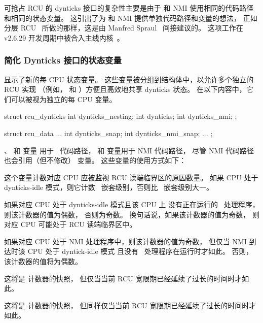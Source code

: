 可抢占 RCU 的 dynticks 接口的复杂性主要是由于
\IRQ 和 NMI 使用相同的代码路径和相同的状态变量。
这引出了为 \IRQ 和 NMI 提供单独代码路径和变量的想法，
正如分层 RCU~\cite{PaulEMcKenney2008HierarchicalRCU}
所做的那样，这是由
Manfred Spraul~\cite{ManfredSpraul2008StateMachineRCU}
间接建议的。
这项工作在 v2.6.29 开发周期中被合入主线内核~\cite{PaulEMcKenney2008commit:64db4cfff99c}。

\subsubsection{简化 Dynticks 接口的状态变量}
\label{sec:formal:State Variables for Simplified Dynticks Interface}

显示了新的每 CPU 状态变量。
这些变量被分组到结构体中，以允许多个独立的 RCU 实现
（例如， 和 ）方便且高效地共享 dynticks 状态。
在以下内容中，它们可以被视为独立的每 CPU 变量。

\begin{listing}
\begin{VerbatimL}
struct rcu_dynticks {
	int dynticks_nesting;
	int dynticks;
	int dynticks_nmi;
};

struct rcu_data {
	...
	int dynticks_snap;
	int dynticks_nmi_snap;
	...
};
\end{VerbatimL}
\caption{简单 Dynticks 接口的变量}
\label{lst:formal:Variables for Simple Dynticks Interface}
\end{listing}

、 和  变量
用于 \IRQ\ 代码路径， 和
 变量用于 NMI 代码路径，
尽管 NMI 代码路径也会引用（但不修改）
 变量。
这些变量的使用方式如下：

\begin{description}[style=nextline]
\item	[\tco{dynticks_nesting}]
	这个变量计数对应 CPU 应被监视 RCU 读端临界区的原因数量。
	如果 CPU 处于 dynticks-idle 模式，则它计数
	\IRQ\ 嵌套级别，否则比 \IRQ\ 嵌套级别大一。
\item	[\tco{dynticks}]
	如果对应 CPU 处于 dynticks-idle 模式且该 CPU 上
	没有正在运行的 \IRQ\ 处理程序，则该计数器的值为偶数，
	否则为奇数。
	换句话说，如果该计数器的值为奇数，
	则对应 CPU 可能处于 RCU 读端临界区中。
\item	[\tco{dynticks_nmi}]
	如果对应 CPU 处于 NMI 处理程序中，则该计数器的值为奇数，
	但仅当 NMI 到达时该 CPU 处于 dyntick-idle 模式
	且没有 \IRQ\ 处理程序在运行时才如此。
	否则，该计数器的值将为偶数。
\item	[\tco{dynticks_snap}]
	这将是  计数器的快照，
	但仅当当前 RCU 宽限期已经延续了过长的时间时才如此。
\item	[\tco{dynticks_nmi_snap}]
	这将是  计数器的快照，
	但同样仅当当前 RCU 宽限期已经延续了过长的时间时才如此。
\end{description}

